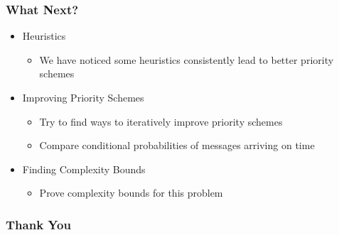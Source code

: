 \documentclass{beamer}
\begin{document}
\begin{frame}
\frametitle{What Next?}
	\begin{itemize}
	\item Heuristics
		\begin{itemize}
		\item We have noticed some heuristics consistently lead to better priority schemes
		\end{itemize}
	\item Improving Priority Schemes
		\begin{itemize}
		\item Try to find ways to iteratively improve priority schemes
		\item Compare conditional probabilities of messages arriving on time
		\end{itemize}
	\item Finding Complexity Bounds
		\begin{itemize}
		\item Prove complexity bounds for this problem
		\end{itemize}
	\end{itemize}
\end{frame}

\begin{frame}
\frametitle{Thank You}
\end{frame}
\end{document}
